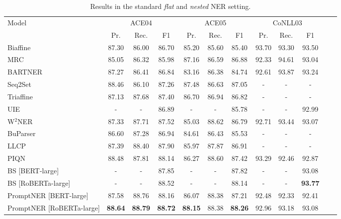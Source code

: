 \documentclass[11pt]{article}
\begin{document}
\begin{table*}[]
\centering
\small
\begin{tabular}{lccccccccccc}
\toprule
\multirow{2}{*}{Model}   & \multicolumn{3}{c}{ACE04} & \multicolumn{3}{c}{ACE05}   & \multicolumn{3}{c}{CoNLL03} \\

 \cmidrule(lr){2-4}  \cmidrule(lr){5-7} \cmidrule(lr){8-10} 
&  Pr.  & Rec. & F1 & Pr.  & Rec. & F1  & Pr.  & Rec. & F1  \\
\midrule
Biaffine \citep{yu-etal-2020-named}       & 87.30  & 86.00  & 86.70 & 85.20  & 85.60  & 85.40  & 93.70 & 93.30 & 93.50 \\
MRC \citep{li-etal-2020-unified} & 85.05 & 86.32 &  85.98 & 87.16 & 86.59 & 86.88 & 92.33 & 94.61 & 93.04\\
BARTNER \citep{yan-etal-2021-unified-generative} & 87.27 & 86.41 & 86.84 & 83.16 & 86.38 & 84.74 & 92.61  & 93.87 & 93.24  \\
Seq2Set \citep{ijcai2021-542} & 88.46 & 86.10 & 87.26 & 87.48 & 86.63 & 87.05 & - & - & - \\
Triaffine \citep{yuan-etal-2022-fusing} & 87.13 &  87.68 &  87.40 &  86.70 &  86.94 &  86.82 & - & - & - \\
UIE \citep{lu-etal-2022-unified} & - & - & 86.89 & - & - & 85.78 & - & - & 92.99 \\
W$^{2}$NER \citep{li2022unified} & 87.33 &  87.71 &  87.52 & 85.03 & 
88.62 &  86.79 & 92.71 &  93.44 &  93.07 \\
BuParser\citep{yang-tu-2022-bottom} & 86.60  &  87.28   & 86.94  &  84.61  &  86.43  &  85.53  & - & - & - \\
LLCP \cite{lou-etal-2022-nested} & 87.39 &  88.40 &  87.90 &  85.97 &  87.87 &  86.91  & - & - & - \\
PIQN \citep{shen-etal-2022-parallel} & 88.48 & 87.81 & 88.14 & 86.27 & 88.60 & 87.42 & 93.29 & 92.46 & 92.87  \\
BS [BERT-large] \citep{zhu-li-2022-boundary} & - & - &  87.85 & - &  - &  87.82 &  - &  - &  {93.08} \\
BS [RoBERTa-large] \citep{zhu-li-2022-boundary} & - & - &  88.52 & - &  - &  88.14 &  - &  - &  \textbf{93.77} \\
\midrule
PromptNER [BERT-large] & 87.58 & 88.76 & 88.16 & 86.07 & 88.38 & 87.21  & 92.48 & 92.33 & 92.41 \\
PromptNER [RoBERTa-large] & \textbf{88.64} & \textbf{88.79} & \textbf{88.72} & \textbf{88.15} & {88.38} & \textbf{88.26} & 92.96 & 93.18 & 93.08\\
\bottomrule
\end{tabular}
\caption{Results in the standard \textit{flat} and \textit{nested} NER setting.}
\label{tab:sup}
\end{table*}
\end{document}
